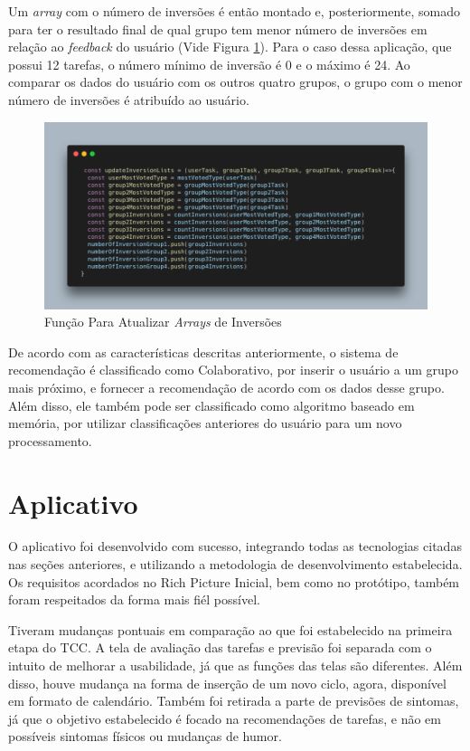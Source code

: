 Um \emph{array} com o número de inversões é então montado e, posteriormente, somado para ter o resultado final de qual grupo tem menor número de 
inversões em relação ao \emph{feedback} do usuário (Vide Figura \ref{fig17}). 
Para o caso dessa aplicação, que possui 12 tarefas, o número mínimo de inversão é 0 e o máximo é 24. Ao comparar os dados do usuário 
com os outros quatro grupos, o grupo com o menor número de inversões é atribuído ao usuário. 

\begin{figure}[ht]
	\caption{Função Para Atualizar \emph{Arrays} de Inversões}
	\begin{center}
	\includegraphics[keepaspectratio=true,scale=0.35]{figuras/code-updateInversionLists.png}
	\end{center}
    \label{fig17}
\end{figure}

De acordo com as características descritas anteriormente, o sistema de recomendação é classificado como Colaborativo, por inserir o usuário a 
um grupo mais próximo, e fornecer a recomendação de acordo com os dados desse grupo. Além disso, ele também pode ser classificado como 
algoritmo baseado em memória, por utilizar classificações anteriores do usuário para um novo processamento.


\section{Aplicativo}

O aplicativo foi desenvolvido com sucesso, integrando todas as tecnologias citadas nas seções anteriores, e 
utilizando a metodologia de desenvolvimento estabelecida. Os requisitos acordados no Rich Picture Inicial, bem como no protótipo, também foram respeitados da forma
mais fiél possível.

Tiveram mudanças pontuais em comparação ao que foi estabelecido na primeira etapa do TCC. A tela de avaliação das tarefas e 
previsão foi separada com o intuito de melhorar a usabilidade, já que as funções das telas são diferentes.
Além disso, houve mudança na forma de inserção de um novo ciclo, agora, disponível em formato de calendário. 
Também foi retirada a parte de previsões de sintomas, já que o objetivo estabelecido é focado na recomendações de 
tarefas, e não em possíveis sintomas físicos ou mudanças de humor.

